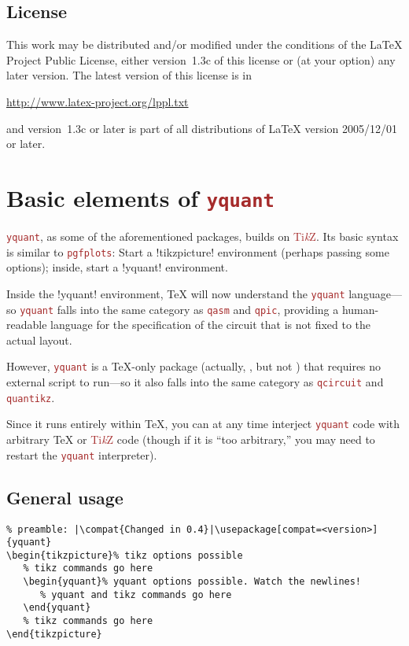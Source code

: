 \documentclass{scrartcl}
\makeatletter
\def\TikZ{\textcolor{brown}{Ti\textit kZ}}
\def\pkg#1{\textcolor{brown}{\texttt{#1}}}
\def\Yquant{\pkg{yquant}}
\newcommand*{\the@orig@section}{}
\let\the@orig@section=\section
\renewcommand*{\section}{%
   \clearpage%
   \the@orig@section%
}
\makeatother
\begin{document}
      \subsection{License}
          This work may be distributed and/or modified under the conditions of the \LaTeX{} Project Public License, either version~1.3c of this license or (at your option) any later version.
          The latest version of this license is in
          \begin{center}
             \url{http://www.latex-project.org/lppl.txt}
          \end{center}
          and version~1.3c or later is part of all distributions of LaTeX version 2005/12/01 or later.

   \section{Basic elements of \Yquant}\label{sec:grammar}
      \Yquant, as some of the aforementioned packages, builds on \TikZ.
      Its basic syntax is similar to \pkg{pgfplots}: Start a \tex!tikzpicture! environment (perhaps passing some options); inside, start a \tex!yquant! environment.

      Inside the \tex!yquant! environment, \TeX{} will now understand the \Yquant{} language---so \Yquant{} falls into the same category as \pkg{qasm} and \pkg{qpic}, providing a human\hyp readable language for the specification of the circuit that is not fixed to the actual layout.

      However, \Yquant{} is a \TeX\hyp only package (actually, , but not ) that requires no external script to run---so it also falls into the same category as \pkg{qcircuit} and \pkg{quantikz}.

      Since it runs entirely within \TeX, you can at any time interject \Yquant{} code with arbitrary \TeX{} or \TikZ{} code (though if it is ``too arbitrary,'' you may need to restart the \Yquant{} interpreter).

      \subsection{General usage}
         \begin{verbatim}
% preamble: |\compat{Changed in 0.4}|\usepackage[compat=<version>]{yquant}
\begin{tikzpicture}% tikz options possible
   % tikz commands go here
   \begin{yquant}% yquant options possible. Watch the newlines!
      % yquant and tikz commands go here
   \end{yquant}
   % tikz commands go here
\end{tikzpicture}
         \end{verbatim}
\end{document}
